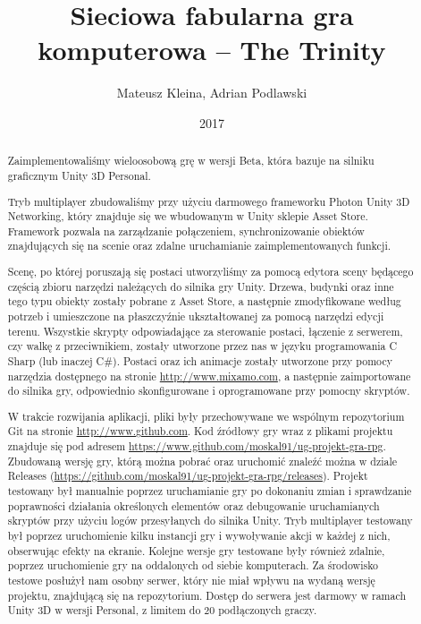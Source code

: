 \documentclass[openright]{xmgr}
\author   {Mateusz Kleina, Adrian Podlawski}
\title    {Sieciowa fabularna gra komputerowa -- The Trinity}
\date     {2017}
\begin{document}
\begin{abstract}
  Zaimplementowaliśmy wieloosobową grę w wersji Beta, która bazuje na silniku graficznym Unity 3D Personal.
  
  Tryb multiplayer zbudowaliśmy przy użyciu darmowego frameworku Photon Unity 3D Networking, który znajduje się we wbudowanym w Unity sklepie Asset Store.
  Framework pozwala na zarządzanie połączeniem, synchronizowanie obiektów znajdujących się na scenie oraz zdalne uruchamianie zaimplementowanych funkcji.

  Scenę, po której poruszają się postaci utworzyliśmy za pomocą edytora sceny będącego częścią zbioru narzędzi należących do silnika gry Unity.
  Drzewa, budynki oraz inne tego typu obiekty zostały pobrane z Asset Store, a następnie zmodyfikowane według potrzeb i umieszczone na płaszczyźnie ukształtowanej za pomocą narzędzi edycji terenu.
  Wszystkie skrypty odpowiadające za sterowanie postaci, łączenie z serwerem, czy walkę z przeciwnikiem, zostały utworzone przez nas w języku programowania C Sharp (lub inaczej C\#).
  Postaci oraz ich animacje zostały utworzone przy pomocy narzędzia dostępnego na stronie \url{http://www.mixamo.com}, a następnie zaimportowane do silnika gry, odpowiednio skonfigurowane i oprogramowane przy pomocny skryptów.

  W trakcie rozwijania aplikacji, pliki były przechowywane we wspólnym repozytorium Git na stronie \url{http://www.github.com}. Kod źródłowy gry wraz z plikami projektu znajduje się pod adresem \url{https://www.github.com/moskal91/ug-projekt-gra-rpg}. Zbudowaną wersję gry, którą można pobrać oraz uruchomić znaleźć można w dziale Releases (\url{https://github.com/moskal91/ug-projekt-gra-rpg/releases}).
  Projekt testowany był manualnie poprzez uruchamianie gry po dokonaniu zmian i sprawdzanie poprawności działania określonych elementów oraz debugowanie uruchamianych skryptów przy użyciu logów przesyłanych do silnika Unity. Tryb multiplayer testowany był poprzez uruchomienie kilku instancji gry i wywoływanie akcji w każdej z nich, obserwując efekty na ekranie. Kolejne wersje gry testowane były również zdalnie, poprzez uruchomienie gry na oddalonych od siebie komputerach.
  Za środowisko testowe posłużył nam osobny serwer, który nie miał wpływu na wydaną wersję projektu, znajdującą się na repozytorium. Dostęp do serwera jest darmowy w ramach Unity 3D w wersji Personal, z limitem do 20 podłączonych graczy.
\end{abstract}

\end{document}
